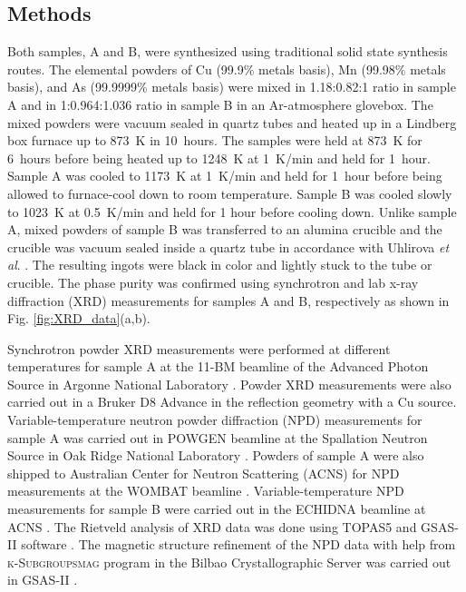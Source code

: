 \documentclass[10pt,doublespacing,edeposit]{uiucthesis2020}
\begin{document}
\begin{mainmatter}


\section{Methods}

Both samples, A and B, were synthesized using traditional solid state synthesis routes. The elemental powders of Cu (99.9\% metals basis), Mn (99.98\% metals basis), and As (99.9999\% metals basis) were mixed in 1.18:0.82:1 ratio in sample A and in 1:0.964:1.036 ratio in sample B in an Ar-atmosphere glovebox.  %
The mixed powders were vacuum sealed in quartz tubes and heated up in a Lindberg box furnace up to 873~K in 10~hours. The samples were held at 873~K for 6~hours before being heated up to 1248~K at 1~K/min and held for 1~hour. Sample A was cooled to 1173~K at 1~K/min and held for 1~hour before being allowed to furnace-cool down to room temperature. Sample B was cooled slowly to 1023~K at 0.5~K/min and held for 1 hour before cooling down. Unlike sample A, mixed powders of sample B was transferred to an alumina crucible and the crucible was vacuum sealed inside a quartz tube in accordance with Uhlirova \textit{et al}. \cite{Uhlirova2019}. The resulting ingots were black in color and lightly stuck to the tube or crucible. The phase purity was confirmed using synchrotron and lab x-ray diffraction (XRD) measurements for samples A and B, respectively as shown in Fig. \ref{fig:XRD_data}(a,b).

Synchrotron powder XRD measurements were performed at different temperatures for sample A at the 11-BM beamline of the Advanced Photon Source in Argonne National Laboratory \cite{wang_dedicated_2008}. Powder XRD measurements were also carried out in a Bruker D8 Advance in the reflection geometry with a Cu source. Variable-temperature neutron powder diffraction (NPD) measurements for sample A was carried out in POWGEN beamline at the Spallation Neutron Source in Oak Ridge National Laboratory \cite{Huq:in5025,mason2006spallation}. Powders of sample A were also shipped to Australian Center for Neutron Scattering (ACNS) for NPD measurements at the WOMBAT beamline \cite{STUDER20061013}. Variable-temperature NPD measurements for sample B were carried out in the ECHIDNA beamline at ACNS \cite{Avdeev2018}. The Rietveld analysis of XRD data was done using \textsc{TOPAS5} and \textsc{GSAS-II} software \cite{Coelho:jo5037,Toby:aj5212}. The magnetic structure refinement of the NPD data with help from \textsc{k-Subgroupsmag} program \cite{Perez-Mato2015} in the Bilbao Crystallographic Server was carried out in \textsc{GSAS-II} \cite{Toby:aj5212}.



\end{mainmatter}
\end{document}
